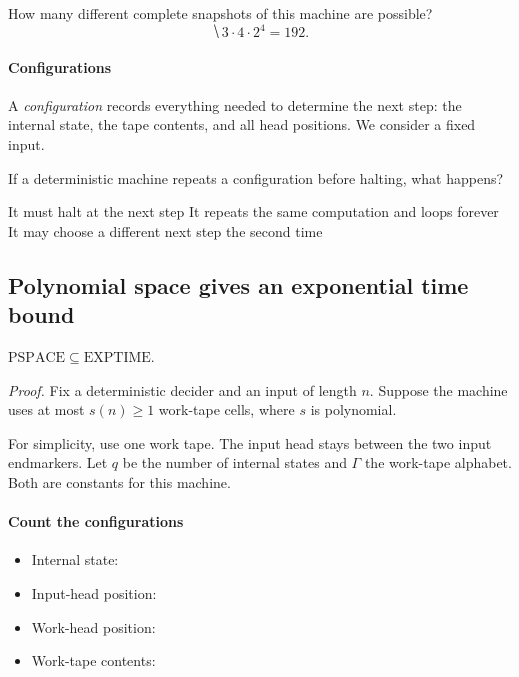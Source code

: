 \documentclass[11  pt]{article}
\begin{document}
How many different complete snapshots of this machine are possible?
\begin{equation*}
    \hide{3\cdot 4\cdot 2^4=192.}
\end{equation*}

\paragraph{Configurations}
A \emph{configuration} records everything needed to determine the next step: the internal state, the tape contents, and all head positions. We consider a fixed input.

\begin{Qu}
    If a deterministic machine repeats a configuration before halting, what happens?
    \begin{itemize}
        \aitem It must halt at the next step
        \bitem It repeats the same computation and loops forever
        \citem It may choose a different next step the second time
    \end{itemize}
\end{Qu}

\newpage
\subsection*{Polynomial space gives an exponential time bound}
\begin{theorem}
    $\mathrm{PSPACE}\subseteq\mathrm{EXPTIME}$.
\end{theorem}

\textit{Proof.} Fix a deterministic decider and an input of length $n$. Suppose the machine uses at most $s(n)\geq 1$ work-tape cells, where $s$ is polynomial.

For simplicity, use one work tape. The input head stays between the two input endmarkers. Let $q$ be the number of internal states and $\Gamma$ the work-tape alphabet. Both are constants for this machine.

\paragraph{Count the configurations}
\begin{itemize}
    \item Internal state: 
    \item Input-head position: 
    \item Work-head position: 
    \item Work-tape contents: 
\end{itemize}
\end{document}
